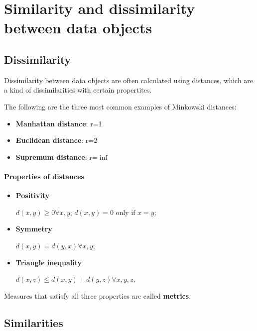 \section{Similarity and dissimilarity between data objects}

\subsection{Dissimilarity}
Dissimilarity between data objects are often calculated using distances, which are a kind of dissimilarities with certain propertites.


The following are the three most common examples of Minkowski distances:

\begin{itemize}
    \item \textbf{Manhattan distance}: r=1
    \item \textbf{Euclidean distance}: r=2
    \item \textbf{Supremum distance}: r=$\inf$
\end{itemize}

\paragraph{Properties of distances}

\begin{itemize}
    \item \textbf{Positivity}
    
    $d(x,y) \geq 0 \forall x,y$; $d(x,y) = 0$ only if $x = y$;

    \item \textbf{Symmetry}

    $d(x,y) = d(y,x) \forall x,y$;

    \item \textbf{Triangle inequality}

    $d(x,z) \leq d(x,y) + d(y,z) \forall x,y,z$.
\end{itemize}
Measures that satisfy all three properties are called \textbf{metrics}.

\subsection{Similarities}

